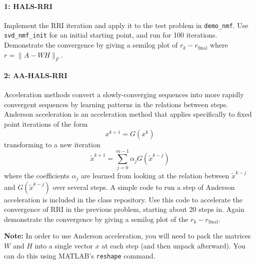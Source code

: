 \documentclass[12pt, leqno]{article} %
\begin{document}

\paragraph*{1: HALS-RRI}
Implement the RRI iteration and apply it to the test problem in
{\tt demo\_nmf}.  Use {\tt svd\_nmf\_init} for an initial starting
point, and run for 100 iterations.  Demonstrate the convergence
by giving a semilog plot of $r_k-r_{\mathrm{final}}$ where $r = \|A-WH\|_F$.

\paragraph*{2: AA-HALS-RRI}
Acceleration methods convert a slowly-converging sequences into more
rapidly convergent sequences by learning patterns in the relations
between steps.  Anderson acceleration is an acceleration method
that applies specifically to fixed point iterations of the form
\[
  x^{k+1} = G(x^k)
\]
transforming to a new iteration
\[
  \tilde{x}^{k+1} = \sum_{j=0}^{m-1} \alpha_j G(\tilde{x}^{k-j})
\]
where the coefficients $\alpha_j$ are learned from looking
at the relation between $\tilde{x}^{k-j}$ and $G(\tilde{x}^{k-j})$
over several steps.
%
A simple code to run a step of Anderson acceleration is included
in the class repository.  Use this code to accelerate the convergence
of RRI in the previous problem, starting about 20 steps in.
Again demonstrate the convergence by giving a semilog plot
of the $r_k-r_{\mathrm{final}}$.

{\bf Note:} In order to use Anderson acceleration, you will need
to pack the matrices $W$ and $H$ into a single vector $x$ at each
step (and then unpack afterward).  You can do this using MATLAB's
{\tt reshape} command.
\end{document}
